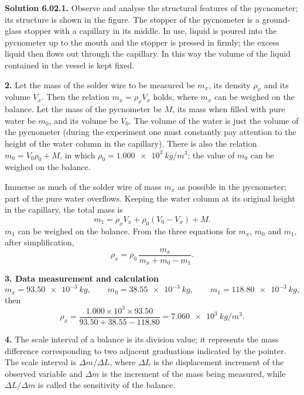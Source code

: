 \medskip
\noindent\textbf{Solution 6.02.}\quad \textbf{1.} Observe and analyse the structural features of the pycnometer; its structure is shown in the figure. The stopper of the pycnometer is a ground-glass stopper with a capillary in its middle. In use, liquid is poured into the pycnometer up to the mouth and the stopper is pressed in firmly; the excess liquid then flows out through the capillary. In this way the volume of the liquid contained in the vessel is kept fixed.

\textbf{2.} Let the mass of the solder wire to be measured be $m_x$, its density $\rho_x$ and its volume $V_x$. Then the relation $m_x=\rho_x V_x$ holds, where $m_x$ can be weighed on the balance. Let the mass of the pycnometer be $M$, its mass when filled with pure water be $m_0$, and its volume be $V_0$. The volume of the water is just the volume of the pycnometer (during the experiment one must constantly pay attention to the height of the water column in the capillary). There is also the relation $m_0=V_0\rho_0+M$, in which $\rho_0=\SI{1.000e3}{kg/m^3}$; the value of $m_0$ can be weighed on the balance.

Immerse as much of the solder wire of mass $m_x$ as possible in the pycnometer; part of the pure water overflows. Keeping the water column at its original height in the capillary, the total mass is
\begin{equation*}
m_1=\rho_x V_x+\rho_0(V_0-V_x)+M.
\end{equation*}
$m_1$ can be weighed on the balance. From the three equations for $m_x$, $m_0$ and $m_1$, after simplification,
\begin{equation*}
\rho_x=\rho_0\,\frac{m_x}{m_x+m_0-m_1}.
\end{equation*}

\textbf{3. Data measurement and calculation}
\begin{equation*}
m_x=\SI{93.50e-3}{kg},\qquad m_0=\SI{38.55e-3}{kg},\qquad m_1=\SI{118.80e-3}{kg},
\end{equation*}
then
\begin{equation*}
\rho_x=\frac{1.000\times10^3\times 93.50}{93.50+38.55-118.80}=\SI{7.060e3}{kg/m^3}.
\end{equation*}

\textbf{4.} The scale interval of a balance is its division value; it represents the mass difference corresponding to two adjacent graduations indicated by the pointer. The scale interval is $\Delta m/\Delta L$, where $\Delta L$ is the displacement increment of the observed variable and $\Delta m$ is the increment of the mass being measured, while $\Delta L/\Delta m$ is called the sensitivity of the balance.

